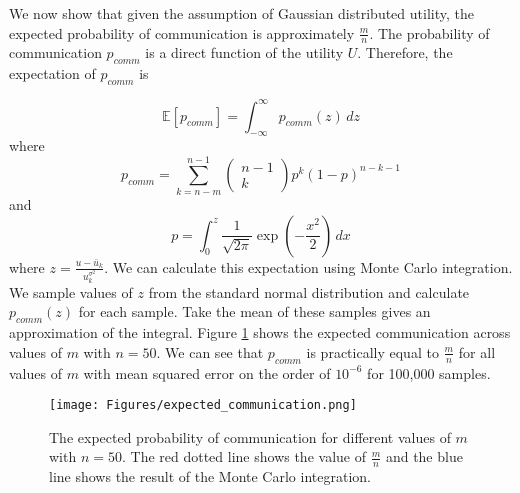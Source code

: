 We now show that given the assumption of Gaussian distributed utility, the expected probability of communication is approximately $\frac{m}{n}$. The probability of communication $p_{comm}$ is a direct function of the utility $U$. Therefore, the expectation of $p_{comm}$ is

\begin{equation*}
    \mathbb{E} \left[ p_{comm}\right] = \int_{-\infty}^\infty p_{comm}(z) \, dz
\end{equation*}
where
\begin{equation*}
    p_{comm} = \sum_{k=n-m}^{n-1} \begin{pmatrix}n-1 \\ k\end{pmatrix}p^k(1-p)^{n-k-1}
\end{equation*}
and 
\begin{equation*}
    p = \int_0^z \frac{1}{\sqrt{2 \pi}} \exp(-\frac{x^2}{2}) \, dx
\end{equation*}
where $z=\frac{u-\bar{u}_k}{u_k^{\sigma^2}}$.
We can calculate this expectation using Monte Carlo integration. We sample values of $z$ from the standard normal distribution and calculate $p_{comm}(z)$ for each sample. Take the mean of these samples gives an approximation of the integral. Figure \ref{fig:ExpComm} shows the expected communication across values of $m$ with $n=50$. We can see that $p_{comm}$ is practically equal to $\frac{m}{n}$ for all values of $m$ with mean squared error on the order of $10^{-6}$ for 100,000 samples.

\begin{figure}
    \centering
    \texttt{[image: Figures/expected\_communication.png]}
    \caption{The expected probability of communication for different values of $m$ with $n=50$. The red dotted line shows the value of $\frac{m}{n}$ and the blue line shows the result of the Monte Carlo integration.}
    \label{fig:ExpComm}
\end{figure}


